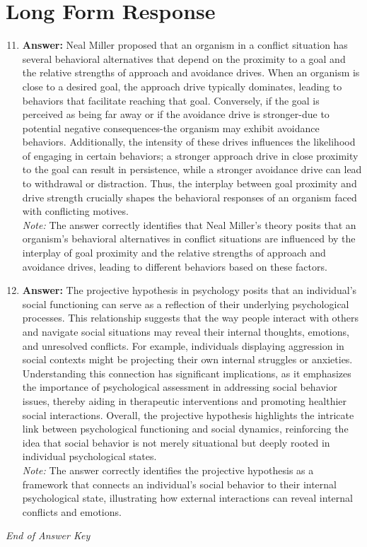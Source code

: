 \documentclass[12pt]{article}
\begin{document}
\section*{Long Form Response}
\begin{enumerate}[label=\arabic*.]
\setcounter{enumi}{10}
\item \textbf{Answer:} Neal Miller proposed that an organism in a conflict situation has several behavioral alternatives that depend on the proximity to a goal and the relative strengths of approach and avoidance drives. When an organism is close to a desired goal, the approach drive typically dominates, leading to behaviors that facilitate reaching that goal. Conversely, if the goal is perceived as being far away or if the avoidance drive is stronger-due to potential negative consequences-the organism may exhibit avoidance behaviors. Additionally, the intensity of these drives influences the likelihood of engaging in certain behaviors; a stronger approach drive in close proximity to the goal can result in persistence, while a stronger avoidance drive can lead to withdrawal or distraction. Thus, the interplay between goal proximity and drive strength crucially shapes the behavioral responses of an organism faced with conflicting motives.
\\ \textit{Note:} The answer correctly identifies that Neal Miller's theory posits that an organism's behavioral alternatives in conflict situations are influenced by the interplay of goal proximity and the relative strengths of approach and avoidance drives, leading to different behaviors based on these factors.
\item \textbf{Answer:} The projective hypothesis in psychology posits that an individual's social functioning can serve as a reflection of their underlying psychological processes. This relationship suggests that the way people interact with others and navigate social situations may reveal their internal thoughts, emotions, and unresolved conflicts. For example, individuals displaying aggression in social contexts might be projecting their own internal struggles or anxieties. Understanding this connection has significant implications, as it emphasizes the importance of psychological assessment in addressing social behavior issues, thereby aiding in therapeutic interventions and promoting healthier social interactions. Overall, the projective hypothesis highlights the intricate link between psychological functioning and social dynamics, reinforcing the idea that social behavior is not merely situational but deeply rooted in individual psychological states.
\\ \textit{Note:} The answer correctly identifies the projective hypothesis as a framework that connects an individual's social behavior to their internal psychological state, illustrating how external interactions can reveal internal conflicts and emotions.
\end{enumerate}

\vfill
\noindent\textit{End of Answer Key}
\end{document}
